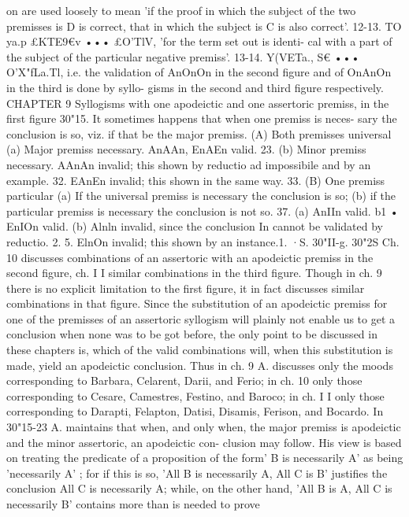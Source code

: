 {on are used loosely to mean 'if the proof in which the subject
of the two premisses is D is correct, that in which the subject is
C is also correct'.
12-13. TO ya.p £KTE9€v ••• £O'TlV, 'for the term set out is identi-
cal with a part of the subject of the particular negative premiss'.
13-14. Y(VETa., S€ ••• O'X"fLa.Tl, i.e. the validation of AnOnOn
in the second figure and of OnAnOn in the third is done by syllo-
gisms in the second and third figure respectively.
CHAPTER 9
Syllogisms with one apodeictic and one assertoric premiss, in the
first figure
30"15. It sometimes happens that when one premiss is neces-
sary the conclusion is so, viz. if that be the major premiss.
(A) Both premisses universal
(a) Major premiss necessary. AnAAn, EnAEn valid.
23. (b) Minor premiss necessary. AAnAn invalid; this shown
by reductio ad impossibile and by an example.
32. EAnEn invalid; this shown in the same way.
33.
(B) One premiss particular
(a) If the universal premiss is necessary the conclusion is so;
(b) if the particular premiss is necessary the conclusion is not so.
37. (a) AnIIn valid.
b1 •
EnIOn valid.
(b) Alnln invalid, since the conclusion In cannot be validated
by reductio.
2.
5. ElnOn invalid; this shown by an instance.1. ·S. 30"II-g. 30"2S
Ch. 10 discusses combinations of an assertoric with an apodeictic
premiss in the second figure, ch. I I similar combinations in the
third figure. Though in ch. 9 there is no explicit limitation to the
first figure, it in fact discusses similar combinations in that figure.
Since the substitution of an apodeictic premiss for one of the
premisses of an assertoric syllogism will plainly not enable us
to get a conclusion when none was to be got before, the only
point to be discussed in these chapters is, which of the valid
combinations will, when this substitution is made, yield an
apodeictic conclusion. Thus in ch. 9 A. discusses only the moods
corresponding to Barbara, Celarent, Darii, and Ferio; in ch. 10
only those corresponding to Cesare, Camestres, Festino, and
Baroco; in ch. I I only those corresponding to Darapti, Felapton,
Datisi, Disamis, Ferison, and Bocardo.
In 30"15-23 A. maintains that when, and only when, the major
premiss is apodeictic and the minor assertoric, an apodeictic con-
clusion may follow. His view is based on treating the predicate of
a proposition of the form' B is necessarily A' as being 'necessarily
A' ; for if this is so, 'All B is necessarily A, All C is B' justifies the
conclusion All C is necessarily A; while, on the other hand, 'All B
is A, All C is necessarily B' contains more than is needed to prove
}

